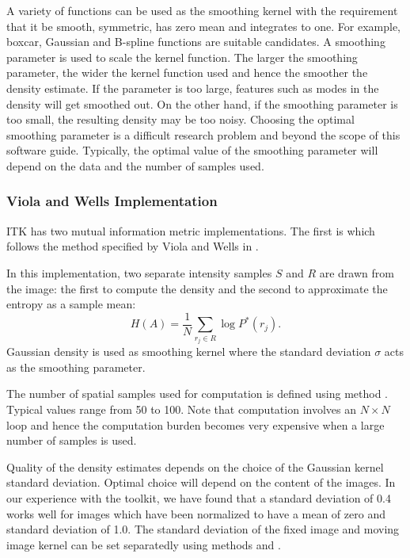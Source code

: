 A variety of functions can be used as the smoothing kernel with the
requirement that it be smooth, symmetric, has zero mean and
integrates to one. For example, boxcar, Gaussian and B-spline functions
are suitable candidates.
A smoothing parameter is used to scale the kernel function.
The larger the smoothing parameter, the wider the kernel function
used and hence the smoother the density estimate. If the parameter is
too large, features such as modes in the density will get smoothed out.
On the other hand, if the smoothing parameter is too small, the
resulting density may be too noisy. Choosing the optimal smoothing parameter 
is a difficult research 
problem and beyond the scope of this software guide.
Typically, the optimal value of the smoothing parameter will 
depend on the data and the number of samples used.

\subsubsection{Viola and Wells Implementation}
ITK has two mutual information metric implementations. The first is 
 which follows the method specified
by Viola and Wells in \cite{Viola1997}.


In this implementation, two separate intensity samples $S$ and $R$ are drawn
from the image: the first to compute the density and the second to approximate
the entropy as a sample mean:
\begin{equation}
H(A) = \frac{1}{N} \sum_{r_j \in R} \log P^{*}(r_j).
\end{equation}
Gaussian density is used as smoothing kernel where the standard deviation
$\sigma$ acts as the smoothing parameter.


The number of spatial samples used for computation is defined using
method . Typical values range from 50 to 100.
Note that computation involves an $N \times N$ loop and hence the computation
burden becomes very expensive when a large number of samples is used.

Quality of the density estimates depends on the choice of the Gaussian kernel
standard deviation. Optimal choice will depend on the content of the images.
In our experience with the toolkit, we have found that a standard deviation
of 0.4 works well for images which have been normalized to have a mean
of zero and standard deviation of 1.0. The standard deviation of the fixed image
and moving image kernel can be set separatedly using methods 
 and .

